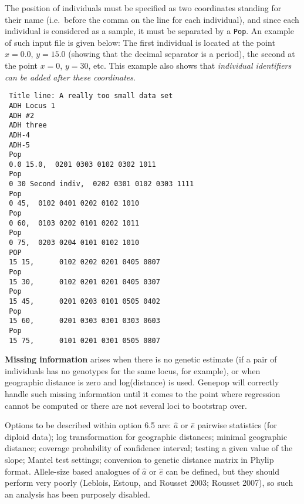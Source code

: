 \documentclass[12pt,]{book}
\begin{document}
The position of individuals must be specified as two coordinates
standing for their name (i.e.~before the comma on the line for each
individual), and since each individual is considered as a sample, it
must be separated by a \texttt{Pop}. An example of such input file is
given below: The first individual is located at the point \(x = 0.0\),
\(y = 15.0\) (showing that the decimal separator is a period), the
second at the point \(x = 0\), \(y =30\), etc. This example also shows
that \emph{individual identifiers can be added after these coordinates}.

\begin{verbatim}
 Title line: A really too small data set
 ADH Locus 1
 ADH #2
 ADH three
 ADH-4
 ADH-5
 Pop
 0.0 15.0,  0201 0303 0102 0302 1011
 Pop
 0 30 Second indiv,  0202 0301 0102 0303 1111
 Pop
 0 45,  0102 0401 0202 0102 1010
 Pop
 0 60,  0103 0202 0101 0202 1011
 Pop
 0 75,  0203 0204 0101 0102 1010
 POP
 15 15,      0102 0202 0201 0405 0807
 Pop
 15 30,      0102 0201 0201 0405 0307
 Pop
 15 45,      0201 0203 0101 0505 0402
 Pop
 15 60,      0201 0303 0301 0303 0603
 Pop
 15 75,      0101 0201 0301 0505 0807
\end{verbatim}

\textbf{Missing information} arises when there is no genetic estimate
(if a pair of individuals has no genotypes for the same locus, for
example), or when geographic distance is zero and log(distance) is used.
Genepop will correctly handle such missing information until it comes to
the point where regression cannot be computed or there are not several
loci to bootstrap over.

Options to be described within option 6.5 are: \(\hat{a}\) or
\(\hat{e}\) pairwise statistics (for diploid data); log transformation
for geographic distances; minimal geographic distance; coverage
probability of confidence interval; testing a given value of the slope;
Mantel test settings; conversion to genetic distance matrix in Phylip
format. Allele-size based analogues of \(\hat{a}\) or \(\hat{e}\) can be
defined, but they should perform very poorly (Leblois, Estoup, and
Rousset 2003; Rousset 2007), so such an analysis has been purposely
disabled.
\end{document}
